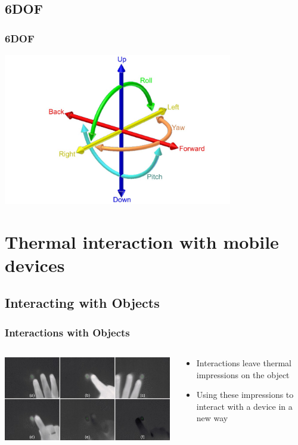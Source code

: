 \documentclass{beamer}
\begin{document}
\subsection{6DOF}
\begin{frame}
	\frametitle{6DOF}
	\includegraphics[width=10cm]{../Sample_paper/images/6DOF_en}
	\begin{center}
	\cite{6DOF}
	\end{center}
\end{frame}

\section[Mobile Thermal Interaction]{Thermal interaction with mobile devices}

\subsection{Interacting with Objects}
\begin{frame}
\frametitle{Interactions with Objects}	
	\begin{columns}
    \begin{column}{0.7\textwidth}
	\includegraphics[width=\textwidth]{images/Thermal}
	
	\cite{Thermal}
	\end{column}
	\begin{column}{0.4\textwidth}
	\begin{itemize}
		\item Interactions leave thermal impressions on the object
		\item Using these impressions to interact with a device in a new way 
	\end{itemize}	
	\end{column}
    \end{columns}
\end{frame}
\end{document}
